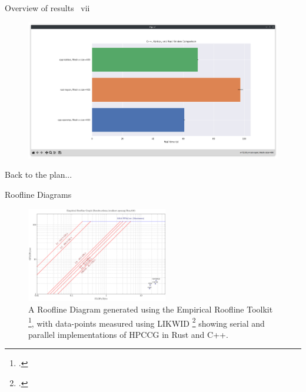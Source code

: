 \documentclass[10pt,aspectratio=169]{beamer}
\begin{document}
\begin{frame}{Overview of results \ vii}
    \begin{figure}[h]
        \centering
        \includegraphics[width=\textwidth]{images/backup_screenshots/kokkos_bar.png}
        \label{fig:kokkos_bar}
    \end{figure}
\end{frame}
\begin{frame}{Back to the plan...}
    \hyperlink{demo}{}
\end{frame}
\begin{frame}{Roofline Diagrams}
    \begin{figure}[H]
        \includegraphics[width=0.55\textwidth]{images/Athena_ERT_generated_roofline.pdf}
        \caption{A Roofline Diagram generated using the Empirical Roofline Toolkit \footcite{yangEmpiricalRooflineMethodology2018}, with data-points measured using LIKWID \footcite{treibigLIKWIDLightweightPerformance2012} showing serial and parallel implementations of HPCCG in Rust and C++.}
        \label{fig:intelvtune}
    \end{figure}
\end{frame}



\end{document}
